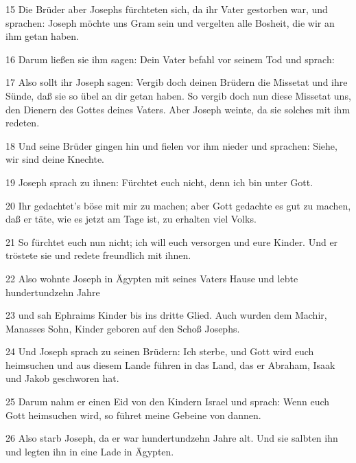 \par 15 Die Brüder aber Josephs fürchteten sich, da ihr Vater gestorben war, und sprachen: Joseph möchte uns Gram sein und vergelten alle Bosheit, die wir an ihm getan haben.
\par 16 Darum ließen sie ihm sagen: Dein Vater befahl vor seinem Tod und sprach:
\par 17 Also sollt ihr Joseph sagen: Vergib doch deinen Brüdern die Missetat und ihre Sünde, daß sie so übel an dir getan haben. So vergib doch nun diese Missetat uns, den Dienern des Gottes deines Vaters. Aber Joseph weinte, da sie solches mit ihm redeten.
\par 18 Und seine Brüder gingen hin und fielen vor ihm nieder und sprachen: Siehe, wir sind deine Knechte.
\par 19 Joseph sprach zu ihnen: Fürchtet euch nicht, denn ich bin unter Gott.
\par 20 Ihr gedachtet's böse mit mir zu machen; aber Gott gedachte es gut zu machen, daß er täte, wie es jetzt am Tage ist, zu erhalten viel Volks.
\par 21 So fürchtet euch nun nicht; ich will euch versorgen und eure Kinder. Und er tröstete sie und redete freundlich mit ihnen.
\par 22 Also wohnte Joseph in Ägypten mit seines Vaters Hause und lebte hundertundzehn Jahre
\par 23 und sah Ephraims Kinder bis ins dritte Glied. Auch wurden dem Machir, Manasses Sohn, Kinder geboren auf den Schoß Josephs.
\par 24 Und Joseph sprach zu seinen Brüdern: Ich sterbe, und Gott wird euch heimsuchen und aus diesem Lande führen in das Land, das er Abraham, Isaak und Jakob geschworen hat.
\par 25 Darum nahm er einen Eid von den Kindern Israel und sprach: Wenn euch Gott heimsuchen wird, so führet meine Gebeine von dannen.
\par 26 Also starb Joseph, da er war hundertundzehn Jahre alt. Und sie salbten ihn und legten ihn in eine Lade in Ägypten.


